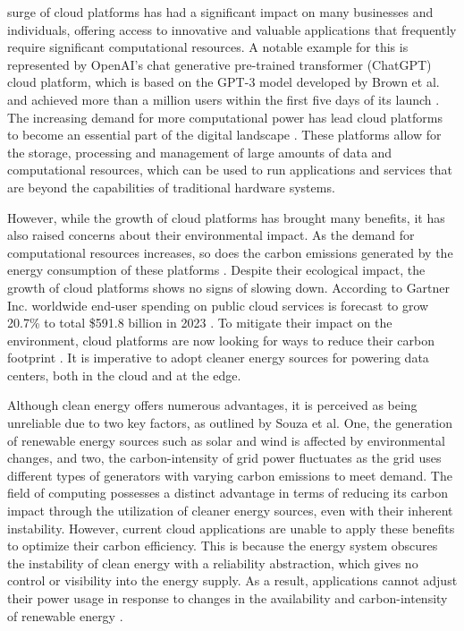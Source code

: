  surge of cloud platforms has had a significant impact on
many businesses and individuals, offering access to innovative and valuable
applications that frequently require significant computational resources. A
notable example for this is represented by OpenAI's chat generative pre-trained
transformer (ChatGPT) cloud platform, which is based on the GPT-3 model
developed by Brown et al. \cite{brown2020} and achieved more than a million
users within the first five days of its launch \cite{brockman2022}. The
increasing demand for more computational power has lead cloud platforms to
become an essential part of the digital landscape \cite{zhang2010}. These
platforms allow for the storage, processing and management of large amounts of
data and computational resources, which can be used to run applications and
services that are beyond the capabilities of traditional hardware systems.

However, while the growth of cloud platforms has brought many benefits, it has
also raised concerns about their environmental impact. As the demand for
computational resources increases, so does the carbon emissions generated by the
energy consumption of these platforms \cite{siddik2021}. Despite their
ecological impact, the growth of cloud platforms shows no signs of slowing down.
According to Gartner Inc. worldwide end-user spending on public cloud services
is forecast to grow 20.7\% to total \$591.8 billion in 2023 \cite{gartner2022}.
To mitigate their impact on the environment, cloud platforms are now looking for
ways to reduce their carbon footprint \cite{google_carbon, amazon_carbon}. It is
imperative to adopt cleaner energy sources for powering data centers, both in
the cloud and at the edge. \medskip

Although clean energy offers numerous advantages, it is perceived as being
unreliable due to two key factors, as outlined by Souza et al.
One, the generation of renewable energy sources such as solar and wind is
affected by environmental changes, and two, the carbon-intensity of grid power
fluctuates as the grid uses different types of generators with varying carbon
emissions to meet demand. The field of computing possesses a distinct advantage
in terms of reducing its carbon impact through the utilization of cleaner energy
sources, even with their inherent instability. However, current cloud
applications are unable to apply these benefits to optimize their carbon
efficiency. This is because the energy system obscures the instability of clean
energy with a reliability abstraction, which gives no control or visibility into
the energy supply. As a result, applications cannot adjust their power usage in
response to changes in the availability and carbon-intensity of renewable
energy \cite{souza2023}.

